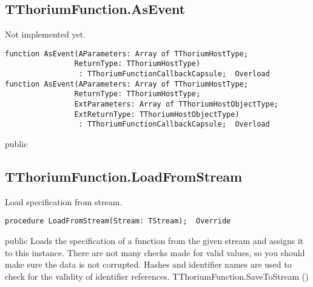 \subsection{TThoriumFunction.AsEvent}
\label{thoriumcorepkg:thorium:tthoriumfunction:asevent}
\begin{FPCList}
\Synopsis
Not implemented yet.\Declaration 

\begin{verbatim}
function AsEvent(AParameters: Array of TThoriumHostType;
                ReturnType: TThoriumHostType)
                 : TThoriumFunctionCallbackCapsule;  Overload
function AsEvent(AParameters: Array of TThoriumHostType;
                ReturnType: TThoriumHostType;
                ExtParameters: Array of TThoriumHostObjectType;
                ExtReturnType: TThoriumHostObjectType)
                 : TThoriumFunctionCallbackCapsule;  Overload
\end{verbatim}
\Visibility
public
\end{FPCList}
\subsection{TThoriumFunction.LoadFromStream}
\label{thoriumcorepkg:thorium:tthoriumfunction:loadfromstream}
\begin{FPCList}
\Synopsis
Load specification from stream.\Declaration 

\begin{verbatim}
procedure LoadFromStream(Stream: TStream);  Override
\end{verbatim}
\Visibility
public
\Description
Loads the specification of a function from the given stream and assigns it to this instance. There are not many checks made for valid values, so you should make sure the data is not corrupted. Hashes and identifier names are used to check for the validity of identifier references.\SeeAlso
TThoriumFunction.SaveToStream (\pageref{thoriumcorepkg:thorium:tthoriumfunction:savetostream})\end{FPCList}
